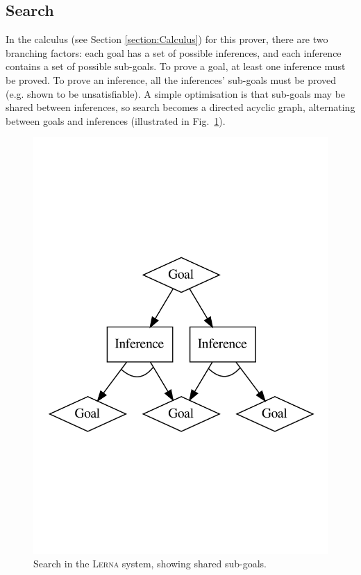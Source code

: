 \documentclass{llncs}
\newcommand{\lerna}{\textsc{Lerna}}
\begin{document}
\subsection{Search}
In the calculus (see Section \ref{section:Calculus}) for this prover, there are two branching factors: each goal has a set of possible inferences, and each inference contains a set of possible sub-goals.
To prove a goal, at least one inference must be proved.
To prove an inference, all the inferences' sub-goals must be proved (e.g. shown to be unsatisfiable).
A simple optimisation is that sub-goals may be shared between inferences, so search becomes a directed acyclic graph, alternating between goals and inferences (illustrated in Fig.~\ref{fig:search}).

\begin{figure} 
\vspace{-26pt}
	\centering
	\includegraphics[width=0.9\linewidth]{search2.pdf}
	\caption{Search in the \lerna{} system, showing shared sub-goals.\label{fig:search}}
\end{figure}	
\end{document}
